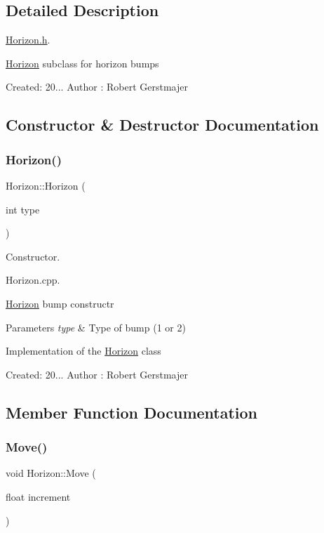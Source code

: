 \subsection{Detailed Description}
\mbox{\hyperlink{_horizon_8h_source}{Horizon.\+h}}. 

\mbox{\hyperlink{class_horizon}{Horizon}} subclass for horizon bumps

Created\+: 20... Author \+: Robert Gerstmajer 

\subsection{Constructor \& Destructor Documentation}
\mbox{\label{class_horizon_adbdceabfe68477247ecb2c469e4d8187}} 
\subsubsection{\texorpdfstring{Horizon()}{Horizon()}}
{\footnotesize\ttfamily Horizon\+::\+Horizon (\begin{DoxyParamCaption}\item[{int}]{type }\end{DoxyParamCaption})}



Constructor. 

Horizon.\+cpp.

\mbox{\hyperlink{class_horizon}{Horizon}} bump constructr 
\begin{DoxyParams}{Parameters}
{\em type} & Type of bump (1 or 2)\\
\hline
\end{DoxyParams}
Implementation of the \mbox{\hyperlink{class_horizon}{Horizon}} class

Created\+: 20... Author \+: Robert Gerstmajer 

\subsection{Member Function Documentation}
\mbox{\label{class_horizon_a845596ecfc2953f0d124e5fd0d7cb1d3}} 
\subsubsection{\texorpdfstring{Move()}{Move()}}
{\footnotesize\ttfamily void Horizon\+::\+Move (\begin{DoxyParamCaption}\item[{float}]{increment }\end{DoxyParamCaption})}



